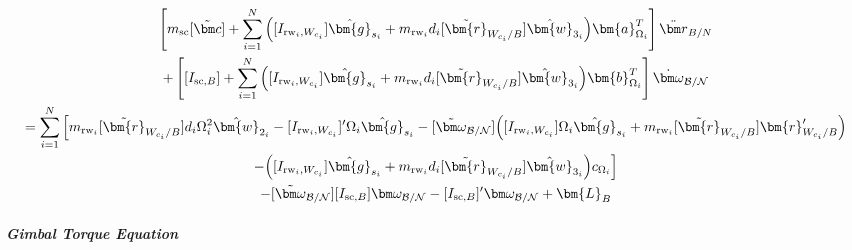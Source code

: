 \begin{multline}
\left[ m_{\text{sc}}[\tilde{\bm c}]+ \sum\limits_{i=1}^{N}\Big([I_{\text{rw}_i,W_{c_i}}]\hat{\bm{g}}_{s_i} + m_{\text{rw}_i}d_i[\tilde{\bm{r}}_{W_{c_i}/B}]\hat{\bm{w}}_{3_i}\Big)\bm{a}_{\Omega_i}^T \right] \ddot{\bm r}_{B/N}
\\
+ \left[ [I_{\text{sc},B}] + \sum\limits_{i=1}^{N}\Big([I_{\text{rw}_i,W_{c_i}}]\hat{\bm{g}}_{s_i} + m_{\text{rw}_i}d_i[\tilde{\bm{r}}_{W_{c_i}/B}]\hat{\bm{w}}_{3_i}\Big)\bm{b}_{\Omega_i}^T \right] \dot{\bm\omega}_{\cal B/N}
\\=
\sum\limits_{i=1}^{N}\Big[ m_{\text{rw}_i}[\tilde{\bm{r}}_{W_{c_i}/B}]d_i \Omega_i^2\hat{\bm{w}}_{2_i}-[I_{\text{rw}_i,W_{c_i}}]'\Omega_i \hat{\bm{g}}_{s_i} -[\tilde{\bm\omega}_{\cal B/N}]\Big([I_{\text{rw}_i,W_{c_i}}]\Omega_i \hat{\bm{g}}_{s_i}+ m_{\text{rw}_i}[\tilde{\bm{r}}_{W_{c_i}/B}]\bm{r}'_{W_{c_i}/B}\Big) \\
-\Big([I_{\text{rw}_i,W_{c_i}}]\hat{\bm{g}}_{s_i} + m_{\text{rw}_i}d_i[\tilde{\bm{r}}_{W_{c_i}/B}]\hat{\bm{w}}_{3_i}\Big)c_{\Omega_i}\Big]
\\  -[\tilde{\bm\omega}_{\cal B/N}][I_{\text{sc},B}]\bm\omega_{\cal B/N}-  [I_{\text{sc},B}]'\bm\omega_{\cal B/N} + \bm{L}_B
\end{multline}

\subparagraph{Gimbal Torque Equation}


